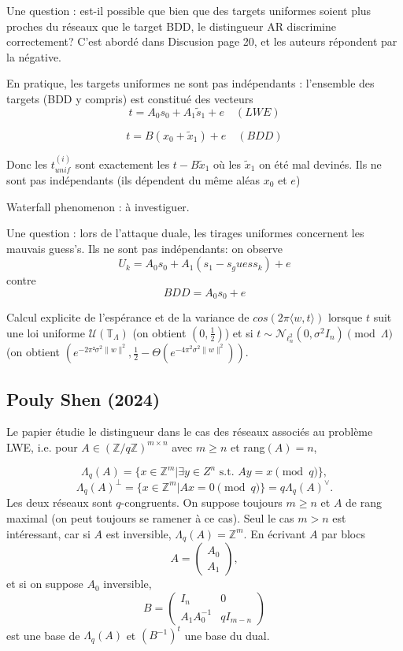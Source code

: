 \documentclass{article}
\begin{document}
\subsubsection{}

Une question : est-il possible que bien que des targets uniformes soient plus proches du réseaux que le target BDD, le distingueur AR discrimine correctement? C'est abordé dans Discusion page 20, et les auteurs répondent par la négative.

En pratique, les targets uniformes ne sont pas indépendants : l'ensemble des targets (BDD y compris) est constitué des vecteurs 
$$ t = A_0 s_0 +A_1 \tilde s_1 + e \quad (LWE) $$

$$ t = B (x_0 + \tilde x_1 ) + e \quad (BDD) $$

Donc les $t^{(i)}_{unif} $ sont exactement les $t-B\tilde x_1$ où les $\tilde x_1$ on été mal devinés. Ils ne sont pas indépendants (ils dépendent du même aléas $x_0$ et $e$)  

Waterfall phenomenon : à investiguer. 

Une question : lors de l'attaque duale, les tirages uniformes concernent les mauvais guess's. Ils ne sont pas indépendants: on observe
$$ U_k = A_0 s_0 + A_1 (s_1 - s_guess_k) + e $$
contre 
$$ BDD = A_0 s_0 + e $$

Calcul explicite de l'espérance et de la variance de $ cos( 2\pi \langle w , t\rangle )$ lorsque $t$ suit une loi uniforme $\mathcal U(\mathbb T_\Lambda)$ (on obtient $(0,\frac{1}{2})$) et si $t\sim \mathcal N_{\ell^2_n}(0 , \sigma^2 I_n) \pmod{\Lambda}$ (on obtient $(e^{-2\pi² \sigma^2 \|w\|^2} , \frac{1}{2} - \Theta(e^{-4\pi^2\sigma^2 \|w\|^2}))$.

\subsection{Pouly Shen (2024)}

Le papier étudie le distingueur dans le cas des réseaux associés au problème LWE, i.e. pour $A\in (\mathbb Z /q\mathbb Z )^{m\times n}$ avec $m\geq n$ et rang$(A)=n$,

$$\Lambda_q(A) = \{x\in \mathbb Z^m | \exists y \in Z^n \text{ s.t. }Ay = x \pmod q \} ,$$
$$\Lambda_q(A)^\perp = \{x\in \mathbb Z^m | Ax = 0 \pmod q \} = q \Lambda_q(A)^\vee.$$
Les deux réseaux sont $q$-congruents. On suppose toujours $m\geq n$ et $A$ de rang maximal (on peut toujours se ramener à ce cas). Seul le cas $m>n$ est intéressant, car si $A$ est inversible, $\Lambda_q(A) = \mathbb Z^m$. En écrivant $A$ par blocs 
$$A =\begin{pmatrix} A_0 \\ A_1\end{pmatrix},$$
et si on suppose $A_0$ inversible, 
$$B=\begin{pmatrix} I_n & 0 \\ A_1A_0^{-1} & qI_{m-n}\end{pmatrix} $$
est une base de $\Lambda_q(A)$ et $(B^{-1})^t$ une base du dual.
\end{document}
